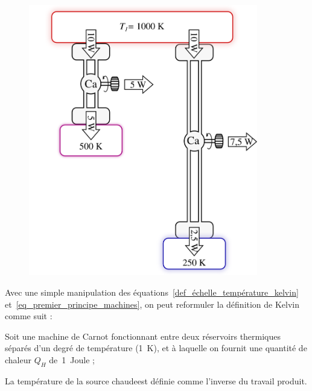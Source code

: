 		\begin{figure}
			\begin{center}
				\includegraphics[width=10cm]{images/echelle_temperature_kelvin.png}
			\end{center}
			\label{fig_échelle_température_kelvin}
		\end{figure}

		Avec une simple manipulation des équations~\ref{def_échelle_température_kelvin} et~\ref{eq_premier_principe_machines}, on peut reformuler la définition de Kelvin comme suit :

		\begin{trucimportant}
			Soit une machine de Carnot fonctionnant
			entre deux réservoirs thermiques séparés d’un degré de température (\SI{1}{\kelvin}),\linebreak
			et à laquelle on fournit une quantité de chaleur $Q_{H}$ de~\SI{1}{Joule} ;

			La température de la source chaude\linebreak est définie comme l’inverse du travail produit.
		\end{trucimportant}

